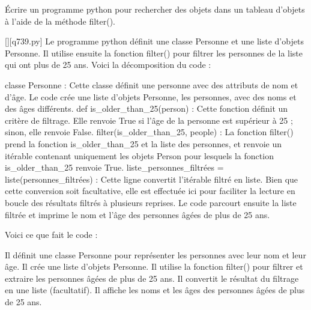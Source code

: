         \question
        Écrire un programme python pour rechercher des objets dans un tableau d'objets à l'aide de la méthode filter().
        \par
        \begin{solution}
            \renewcommand{\nomfichier}{q739.py}
            \pythonfile{\chemincode \nomfichier}[][\nomfichier]
            Le programme python définit une classe Personne et une liste d'objets Personne. Il utilise ensuite la fonction filter() pour filtrer les personnes de la liste qui ont plus de 25 ans. Voici la décomposition du code :

    classe Personne : Cette classe définit une personne avec des attributs de nom et d'âge.
    Le code crée une liste d'objets Personne, les personnes, avec des noms et des âges différents.
    def is\_older\_than\_25(person) : Cette fonction définit un critère de filtrage. Elle renvoie True si l'âge de la personne est supérieur à 25 ; sinon, elle renvoie False.
    filter(is\_older\_than\_25, people) : La fonction filter() prend la fonction is\_older\_than\_25 et la liste des personnes, et renvoie un itérable contenant uniquement les objets Person pour lesquels la fonction is\_older\_than\_25 renvoie True.
    liste\_personnes\_filtrées = liste(personnes\_filtrées) : Cette ligne convertit l'itérable filtré en liste. Bien que cette conversion soit facultative, elle est effectuée ici pour faciliter la lecture en boucle des résultats filtrés à plusieurs reprises.
    Le code parcourt ensuite la liste filtrée et imprime le nom et l'âge des personnes âgées de plus de 25 ans.

Voici ce que fait le code :

    Il définit une classe Personne pour représenter les personnes avec leur nom et leur âge.
    Il crée une liste d'objets Personne.
    Il utilise la fonction filter() pour filtrer et extraire les personnes âgées de plus de 25 ans.
    Il convertit le résultat du filtrage en une liste (facultatif).
    Il affiche les noms et les âges des personnes âgées de plus de 25 ans.
        \end{solution}
        
